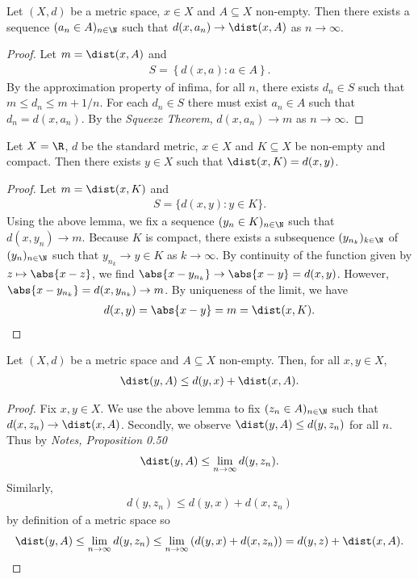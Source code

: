 \documentclass{article}
\begin{document}
\begin{lemma*}
	Let $(X,d)$ be a metric space, $x\in X$ and $A\subseteq X$ non-empty. Then there exists a sequence
	$(a_n\in A)_{n\in\N}$ such that $d(x,a_n)\to\dist(x,A)$ as $n\to\infty$.
	\begin{proof}
		Let $m=\dist(x,A)$ and
		\begin{align*}
			S=\left\lbrace d(x,a):a\in A\right\rbrace.
		\end{align*}
		By the approximation property of infima, for all $n$, there exists $d_n\in S$
		such that $m\leq d_n\leq m+1/n$. For each $d_n\in S$ there must exist $a_n\in A$
		such that $d_n=d(x,a_n)$. By the \emph{Squeeze Theorem}, $d(x,a_n)\to m$ as
		$n\to\infty$.
	\end{proof}
\end{lemma*}

\begin{claim*}[3]
	Let $X=\R$, $d$ be the standard metric, $x\in X$ and $K\subseteq X$ be non-empty and compact.
	Then there exists $y\in X$ such that $\dist(x,K)=d(x,y)$.
	\begin{proof}
		Let $m=\dist(x,K)$ and
		\begin{align*}
			S=\{d(x,y):y\in K\}.
		\end{align*}
		Using the above lemma, we fix a sequence $(y_n\in K)_{n\in\N}$ such that
		$d(x,y_n)\to m$.
		Because $K$ is compact, there exists a subsequence $(y_{n_k})_{k\in\N}$ of $(y_n)_{n\in\N}$ such that
		$y_{n_k} \to y\in K$ as $k\to\infty$. By continuity of the function given by $z\mapsto\abs{x-z}$,
		we find $\abs{x-y_{n_k}}\to\abs{x-y}=d(x,y)$. However, $\abs{x-y_{n_k}}=d(x,y_{n_k})\to m$. By uniqueness of the
		limit, we have
		\begin{align*}
			d(x,y)=\abs{x-y}=m=\dist(x,K).
		\end{align*}
	\end{proof}
\end{claim*}

\begin{claim*}[4]
	Let $(X,d)$ be a metric space and $A\subseteq X$ non-empty. Then, for all $x,y\in X$,
	\begin{align*}
		\dist(y,A)\leq d(y,x)+\dist(x,A).
	\end{align*}
	\begin{proof}
		Fix $x,y\in X$.
		We use the above lemma to fix $(z_n\in A)_{n\in\N}$ such that $d(x,z_n)\to\dist(x,A)$.
		Secondly, we observe $\dist(y,A)\leq d(y,z_n)$ for all $n$. Thus
		by \emph{Notes, Proposition 0.50}
		\begin{align*}
			\dist(y,A)\leq\lim_{n\to\infty} d(y,z_n).
		\end{align*}
		Similarly,
		\begin{align*}
			d(y,z_n) \leq d(y,x) + d(x,z_n)
		\end{align*}
		by definition of a metric space so
		\begin{align*}
			\dist(y,A)  \leq\lim_{n\to\infty} d(y,z_n)
			\leq \lim_{n\to\infty}\left(d(y,x)+d(x,z_n)\right)
			=d(y,z)+\dist(x,A).
		\end{align*}
	\end{proof}
\end{claim*}
\end{document}

